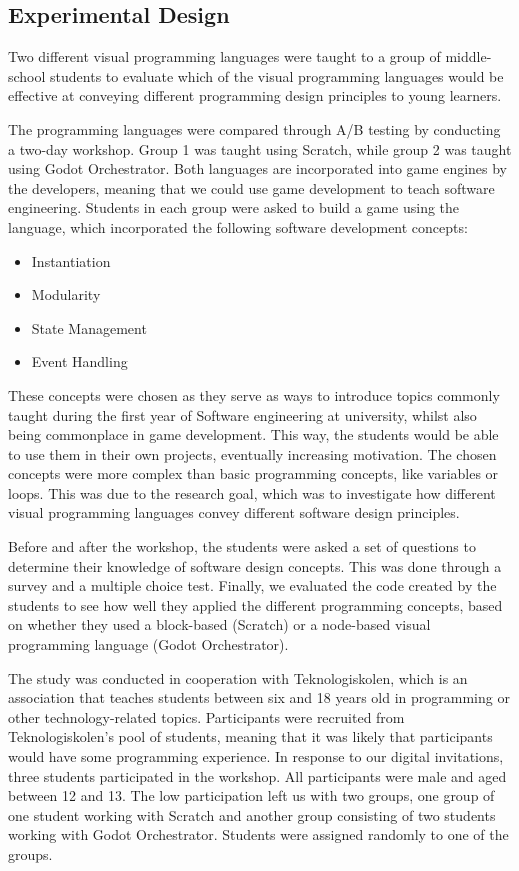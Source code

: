 \subsection{Experimental Design}\label{subsec:experimental-design}
Two different visual programming languages were taught to a group of middle-school students to evaluate which of the visual programming languages would be effective at conveying different programming design principles to young learners.

The programming languages were compared through A/B testing by conducting a two-day workshop.
Group 1 was taught using Scratch, while group 2 was taught using Godot Orchestrator.
Both languages are incorporated into game engines by the developers, meaning that we could use game development to teach software engineering.
Students in each group were asked to build a game using the language, which incorporated the following software development concepts:

\begin{itemize}
    \item Instantiation
    \item Modularity
    \item State Management
    \item Event Handling
\end{itemize}

These concepts were chosen as they serve as ways to introduce topics commonly taught during the first year of Software engineering at university, whilst also being commonplace in game development.
This way, the students would be able to use them in their own projects, eventually increasing motivation.
The chosen concepts were more complex than basic programming concepts, like variables or loops.
This was due to the research goal, which was to investigate how different visual programming languages convey different software design principles.

Before and after the workshop, the students were asked a set of questions to determine their knowledge of software design concepts.
This was done through a survey and a multiple choice test.
Finally, we evaluated the code created by the students to see how well they applied the different programming concepts, based on whether they used a block-based (Scratch) or a node-based visual programming language (Godot Orchestrator).

The study was conducted in cooperation with Teknologiskolen, which is an association that teaches students between six and 18 years old in programming or other technology-related topics.
Participants were recruited from Teknologiskolen's pool of students, meaning that it was likely that participants would have some programming experience.
In response to our digital invitations, three students participated in the workshop.
All participants were male and aged between 12 and 13.
The low participation left us with two groups, one group of one student working with Scratch and another group consisting of two students working with Godot Orchestrator.
Students were assigned randomly to one of the groups.

